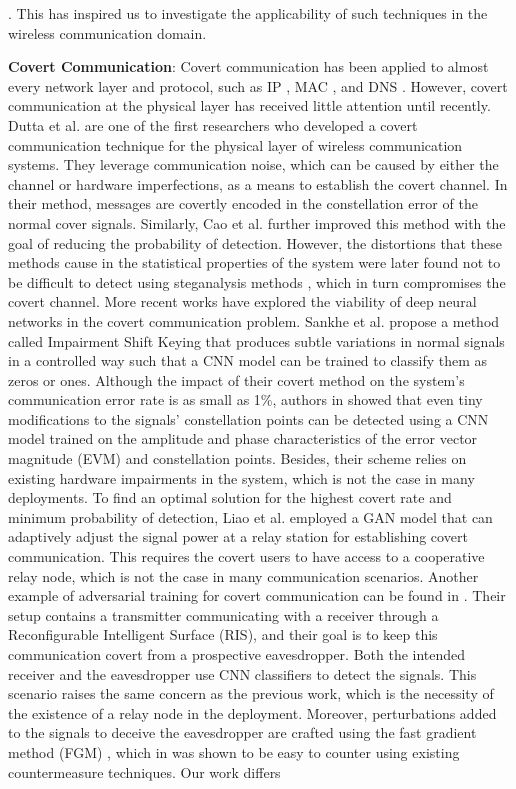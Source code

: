 \cite{martin2023evolving}. This has inspired us to investigate the applicability of such techniques in the wireless communication domain.


\textbf{Covert Communication}: Covert communication has been applied to almost every network layer and protocol, such as IP \cite{cabuk2004ip}, MAC \cite{sheikholeslami2020covert}, and DNS \cite{nussbaum2009robust}. However, covert communication at the physical layer has received little attention until recently. Dutta et al. \cite{dutta2012secret} are one of the first researchers who developed a covert communication technique for the physical layer of wireless communication systems. They leverage communication noise, which can be caused by either the channel or hardware imperfections, as a means to establish the covert channel. In their method, messages are covertly encoded in the constellation error of the normal cover signals. Similarly, Cao et al. \cite{cao2018wireless} further improved this method with the goal of reducing the probability of detection. However, the distortions that these methods cause in the statistical properties of the system were later found not to be difficult to detect using steganalysis methods \cite{huang2020exploiting}, which in turn compromises the covert channel. More recent works have explored the viability of deep neural networks in the covert communication problem. Sankhe et al. \cite{sankhe2019impairment} propose a method called Impairment Shift Keying that produces subtle variations in normal signals in a controlled way such that a CNN model can be trained to classify them as zeros or ones. Although the impact of their covert method on the system's communication error rate is as small as 1\%, authors in \cite{huang2021detection} showed that even tiny modifications to the signals' constellation points can be detected using a CNN model trained on the amplitude and phase characteristics of the error vector magnitude (EVM) and constellation points. Besides, their scheme relies on existing hardware impairments in the system, which is not the case in many deployments. To find an optimal solution for the highest covert rate and minimum probability of detection, Liao et al. \cite{liao2020generative} employed a GAN model that can adaptively adjust the signal power at a relay station for establishing covert communication. This requires the covert users to have access to a cooperative relay node, which is not the case in many communication scenarios. Another example of adversarial training for covert communication can be found in \cite{kim2022covert}. Their setup contains a transmitter communicating with a receiver through a Reconfigurable Intelligent Surface (RIS), and their goal is to keep this communication covert from a prospective eavesdropper. Both the intended receiver and the eavesdropper use CNN classifiers to detect the signals. This scenario raises the same concern as the previous work, which is the necessity of the existence of a relay node in the deployment. Moreover, perturbations added to the signals to deceive the eavesdropper are crafted using the fast gradient method (FGM) \cite{goodfellow2014explaining}, which in \cite{bahramali2021robust} was shown to be easy to counter using existing countermeasure techniques. Our work differs 
